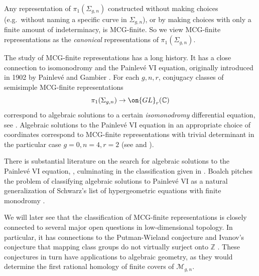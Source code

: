 Any representation of $\pi_1(\Sigma_{g,n})$ constructed without making choices
(e.g.~without naming a specific curve in $\Sigma_{g,n}$),
or by making choices with only a finite amount of indeterminacy, is MCG-finite.
So we view MCG-finite representations
as the \emph{canonical} representations of $\pi_1(\Sigma_{g,n})$.

The study of MCG-finite
representations has a long history.
It has a close
connection to isomonodromy and the Painlev\'e VI equation,
originally introduced in 1902 by Painlev\'e
\cite{painleve:on-the-differential-equations-of-sectond-order}
and Gambier
\cite{gambier:on-the-differential-equations-of-second-order}.
For each $g,n,r$, conjugacy classes of semisimple MCG-finite representations
$$\pi_1(\Sigma_{g,n})\to \on{GL}_r(\mathbb{C})$$ correspond to algebraic solutions
to a certain \emph{isomonodromy} differential equation, see \cite[Theorem A]{CH:isomonodromic}.
Algebraic solutions to the Painlev\'e VI equation in an appropriate choice of coordinates
correspond to MCG-finite representations with trivial determinant in
the particular case $g=0, n=4, r=2$ (see
\cite[\S1-\S3]{mahoux:itroduction-to-the-theory-of-isomonodromic-deformations}
and \cite[\S2]{doran:isomonodromic}).

There is substantial literature on the
search for algebraic solutions
to the Painlev\'e VI equation,
\cite{andreev2002transformations,boalch2005klein,boalch2006fifty,boalchsome,boalch2007higher,cantat2009holomorphic,dubrovin1996geometry,dubrovin2000monodromy,hitchin1996poncelet,hitchin2003lecture,kitaev2006grothendieck,kitaev2005remarks},
culminating in the classification given in \cite{lisovyy2014algebraic}. Boalch \cite{boalch2007towards} pitches the problem of classifying algebraic solutions to Painlev\'e VI as a natural generalization of Schwarz's list of hypergeometric equations with finite monodromy \cite{schwarz1873ueber}.

We will later see that the classification of MCG-finite representations is
closely connected to several major open questions in low-dimensional topology.
In particular, it has connections to the Putman-Wieland conjecture
\cite[Conjecture 1.2]{putmanW:abelian-quotients} and Ivanov's conjecture that mapping class groups do not virtually surject onto $\mathbb{Z}$ \cite[\S7]{Ivanov:problems}.
These conjectures in turn have applications to algebraic geometry, as they would
determine the first rational homology of finite covers of $\mathscr M_{g,n}$.

